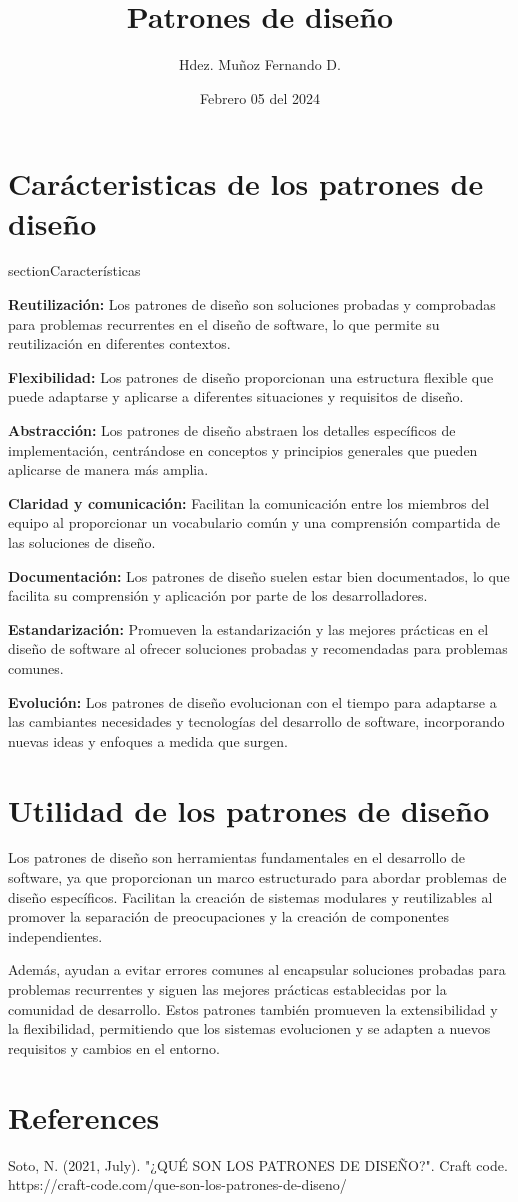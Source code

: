 \documentclass{article}
\title{Patrones de diseño}
\author{Hdez. Muñoz Fernando D.}
\date{Febrero 05 del 2024}
\begin{document}
 
	
				
		\section{Carácteristicas de los patrones de diseño}
		section{Características}
		
		\textbf{Reutilización:} Los patrones de diseño son soluciones probadas y comprobadas para problemas recurrentes en el diseño de software, lo que permite su reutilización en diferentes contextos.
		
		\textbf{Flexibilidad:} Los patrones de diseño proporcionan una estructura flexible que puede adaptarse y aplicarse a diferentes situaciones y requisitos de diseño.
		
		\textbf{Abstracción:} Los patrones de diseño abstraen los detalles específicos de implementación, centrándose en conceptos y principios generales que pueden aplicarse de manera más amplia.
		
		\textbf{Claridad y comunicación:} Facilitan la comunicación entre los miembros del equipo al proporcionar un vocabulario común y una comprensión compartida de las soluciones de diseño.
		
		\textbf{Documentación:} Los patrones de diseño suelen estar bien documentados, lo que facilita su comprensión y aplicación por parte de los desarrolladores.
		
		\textbf{Estandarización:} Promueven la estandarización y las mejores prácticas en el diseño de software al ofrecer soluciones probadas y recomendadas para problemas comunes.
		
		\textbf{Evolución:} Los patrones de diseño evolucionan con el tiempo para adaptarse a las cambiantes necesidades y tecnologías del desarrollo de software, incorporando nuevas ideas y enfoques a medida que surgen.
		
		\section{Utilidad de los patrones de diseño}
		Los patrones de diseño son herramientas fundamentales en el desarrollo de software, ya que proporcionan un marco estructurado para abordar problemas de diseño específicos. Facilitan la creación de sistemas modulares y reutilizables al promover la separación de preocupaciones y la creación de componentes independientes. 
		
		Además, ayudan a evitar errores comunes al encapsular soluciones probadas para problemas recurrentes y siguen las mejores prácticas establecidas por la comunidad de desarrollo. Estos patrones también promueven la extensibilidad y la flexibilidad, permitiendo que los sistemas evolucionen y se adapten a nuevos requisitos y cambios en el entorno. 
		
		 
	\section{References}
	
	Soto, N. (2021, July). "¿QUÉ SON LOS PATRONES DE DISEÑO?". Craft code. 
	https://craft-code.com/que-son-los-patrones-de-diseno/
	
\end{document}
